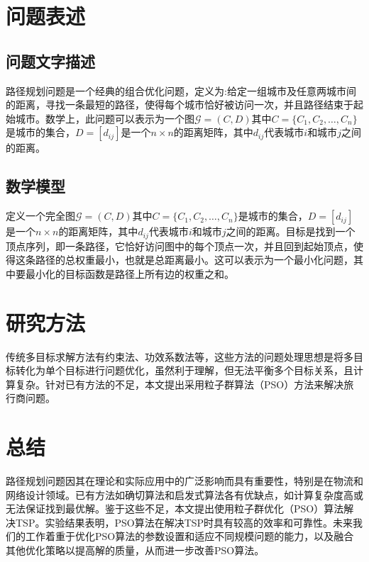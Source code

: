 \documentclass{ctexart}
\begin{document}
\section{问题表述}
\subsection{问题文字描述}
路径规划问题是一个经典的组合优化问题，定义为:给定一组城市及任意两城市间的距离，寻找一条最短的路径，使得每个城市恰好被访问一次，并且路径结束于起始城市\cite{ref8}。数学上，此问题可以表示为一个图$\mathcal{G}=(C,D)$其中$C=\{C_1,C_2,\dots,C_n\}$是城市的集合，$D=[d_{ij}]$是一个$n{\times}n$的距离矩阵，其中$d_{ij}$代表城市$i$和城市$j$之间的距离。
\subsection{数学模型}
定义一个完全图$\mathcal{G}=(C,D)$其中$C=\{C_1,C_2,\dots,C_n\}$是城市的集合，$D=[d_{ij}]$是一个$n{\times}n$的距离矩阵，其中$d_{ij}$代表城市$i$和城市$j$之间的距离。目标是找到一个顶点序列，即一条路径，它恰好访问图中的每个顶点一次，并且回到起始顶点，使得这条路径的总权重最小，也就是总距离最小。这可以表示为一个最小化问题，其中要最小化的目标函数是路径上所有边的权重之和。

\section{研究方法}
传统多目标求解方法有约束法、功效系数法等，这些方法的问题处理思想是将多目标转化为单个目标进行问题优化，虽然利于理解，但无法平衡多个目标关系，且计算复杂\cite{ref9}。针对已有方法的不足，本文提出采用粒子群算法（PSO）方法来解决旅行商问题。
\section{总结}
路径规划问题因其在理论和实际应用中的广泛影响而具有重要性，特别是在物流和网络设计领域。已有方法如确切算法和启发式算法各有优缺点，如计算复杂度高或无法保证找到最优解。鉴于这些不足，本文提出使用粒子群优化（PSO）算法解决TSP。实验结果表明，PSO算法在解决TSP时具有较高的效率和可靠性。未来我们的工作着重于优化PSO算法的参数设置和适应不同规模问题的能力，以及融合其他优化策略以提高解的质量，从而进一步改善PSO算法。

% 
% 


\end{document}
